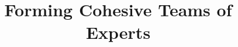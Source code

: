 \documentclass[conference]{IEEEtran}
\begin{document}
%
\title{Forming Cohesive Teams of Experts}




% 


\maketitle
\end{document}
